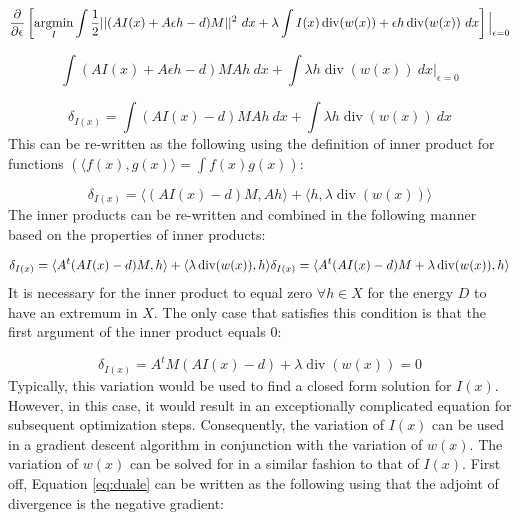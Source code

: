 \begin{equation}
\frac{\partial{}}{\partial{}\epsilon{}}\left[\operatorname*{argmin}_I  \int{}\frac{1}{2}||(AI(x)+A\epsilon{}h - d)M||^{2} \ dx + \lambda{}\int{}I(x)\operatorname{div}(w(x))+\epsilon{}h\operatorname{div}(w(x)) \ dx\right]\Big|_{\epsilon=0}
\end{equation}

\begin{equation}
\int{}(AI(x)+A\epsilon{}h - d)MAh \ dx + \int{}\lambda{}h\operatorname{div}(w(x)) \ dx\Big|_{\epsilon=0}
\end{equation}

\begin{equation}
\delta_{I(x)} = \int{}(AI(x) - d)MAh \ dx + \int{}\lambda{}h\operatorname{div}(w(x)) \ dx
\end{equation}
This can be re-written as the following using the definition of inner product for functions $\left(\langle{}f(x),g(x)\rangle{} = \int{}f(x)g(x)\right)$:

\begin{equation}
\delta_{I(x)} = \langle{}(AI(x) - d)M,Ah\rangle{} + \langle{}h,\lambda{}\operatorname{div}(w(x))\rangle{} 
\end{equation}
The inner products can be re-written and combined in the following manner based on the properties of inner products:

\begin{equation}
\delta_{I(x)} = \langle{}A^t(AI(x) - d)M,h\rangle{} + \langle{}\lambda{}\operatorname{div}(w(x)),h\rangle{} \\
\delta_{I(x)} = \langle{}A^t(AI(x) - d)M + \lambda{}\operatorname{div}(w(x)),h\rangle{}\label{eq:tvinnerI}
\end{equation}
It is necessary for the inner product to equal zero $\forall h\in{}X$ for the energy $D$ to have an extremum in $X$.  The only case that satisfies this condition is that the first argument of the inner product equals 0: 

\begin{equation}
\delta_{I(x)}  = A^tM\left(AI(x)-d\right) + \lambda{}\operatorname{div}(w(x)) = 0\label{eq:tvdeltaI}
\end{equation}
Typically, this variation would be used to find a closed form solution for $I(x)$. However, in this case, it would result in an exceptionally complicated equation for subsequent optimization steps. Consequently, the variation of $I(x)$ can be used in a gradient descent algorithm in conjunction with the variation of $w(x)$. The variation of $w(x)$ can be solved for in a similar fashion to that of $I(x)$.  First off, Equation \ref{eq:duale} can be written as the following using that the adjoint of divergence is the negative gradient:

